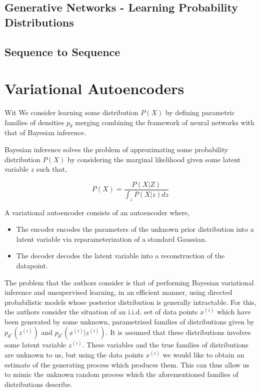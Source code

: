 \documentclass[a4paper,12pt]{article}
\begin{document}
\noindent

\subsection{Generative Networks - Learning Probability Distributions}


\subsection{Sequence to Sequence}


\section{Variational Autoencoders}

Wit
We consider learning some distribution \(P(X)\) by defining parametric families of densities \(p_{\theta}\)
merging combining the framework of neural networks with that of Bayesian inference. 

Bayesian inference solves the problem of approximating some probability distribution \(P(X)\) by considering the marginal likelihood given some latent variable \(z\) such that, 

\begin{equation}
P(X) = \dfrac{P(X \vert Z)}{\int_z P(X \vert z) dz}
\end{equation}

A variational autoencoder consists of an autoencoder where,
\begin{itemize}
\item The encoder encodes the parameters of the unknown prior distribution into a latent variable via reparameterization of a standard Gaussian.
\item The decoder decodes the latent variable into a reconstruction of the datapoint. 
\end{itemize}

The problem that the authors consider is that of performing Bayesian variational inference and unsupervised learning, in an efficient manner, using directed probabilistic models whose posterior distribution is generally intractable.
For this, the authors consider the situation of an i.i.d. set of data points \(x^{(i)}\) which have been generated by some unknown, parametrised families of distributions given by \(p_{\theta^*}(z^{(i)})\) and \(p_{\theta^*}(x^{(i)} \vert z^{(i)})\).
It is assumed that these distributions involves some latent variable \(z^{(i)}\). These variables and the true families of distributions are unknown to us, but using the data points \(x^{(i)}\) we would like to obtain an estimate of the generating process which produces them. This can thus allow us to mimic the unknown random process which the aforementioned families of distributions describe.
\end{document}
